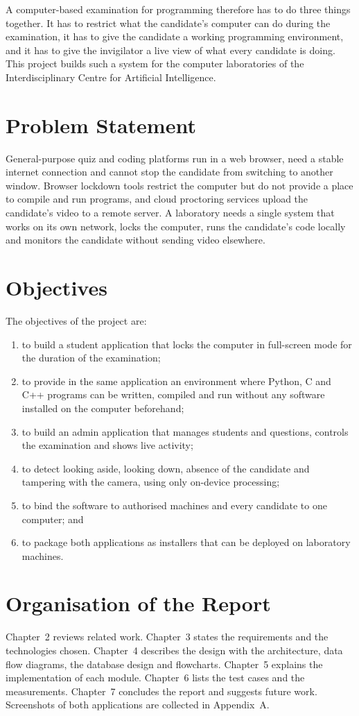 \documentclass[12pt,a4paper]{report}
\begin{document}
A computer-based examination for programming therefore has to do three things together. It has to restrict what the candidate's computer can do during the examination, it has to give the candidate a working programming environment, and it has to give the invigilator a live view of what every candidate is doing. This project builds such a system for the computer laboratories of the Interdisciplinary Centre for Artificial Intelligence.

\section{Problem Statement}
General-purpose quiz and coding platforms run in a web browser, need a stable internet connection and cannot stop the candidate from switching to another window. Browser lockdown tools restrict the computer but do not provide a place to compile and run programs, and cloud proctoring services upload the candidate's video to a remote server. A laboratory needs a single system that works on its own network, locks the computer, runs the candidate's code locally and monitors the candidate without sending video elsewhere.

\section{Objectives}
The objectives of the project are:
\begin{enumerate}
  \item to build a student application that locks the computer in full-screen mode for the duration of the examination;
  \item to provide in the same application an environment where Python, C and C++ programs can be written, compiled and run without any software installed on the computer beforehand;
  \item to build an admin application that manages students and questions, controls the examination and shows live activity;
  \item to detect looking aside, looking down, absence of the candidate and tampering with the camera, using only on-device processing;
  \item to bind the software to authorised machines and every candidate to one computer; and
  \item to package both applications as installers that can be deployed on laboratory machines.
\end{enumerate}

\section{Organisation of the Report}
Chapter~2 reviews related work. Chapter~3 states the requirements and the technologies chosen. Chapter~4 describes the design with the architecture, data flow diagrams, the database design and flowcharts. Chapter~5 explains the implementation of each module. Chapter~6 lists the test cases and the measurements. Chapter~7 concludes the report and suggests future work. Screenshots of both applications are collected in Appendix~A.
\end{document}
